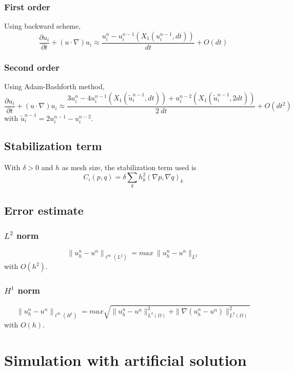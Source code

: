 \documentclass[a4paper]{article}
\begin{document}
\subsubsection{First order}
Using backward scheme, 
\[ \dfrac{\partial u_{i}}{\partial t} + (u \cdot \nabla)u_{i} \approx \dfrac{u_{i}^{n}-u_{i}^{n-1}(X_{1}(u_{i}^{n-1},dt))}{dt} + O(dt) \]
\subsubsection{Second order}
Using Adam-Bashforth method,
\[\dfrac{\partial u_{i}}{\partial t} + (u \cdot \nabla)u_{i} \approx \dfrac{3u_{i}^{n}-4u_{i}^{n-1}(X_{1}(\tilde{u}_{i}^{n-1},dt))+u_{i}^{n-2}(X_{1}(\tilde{u}_{i}^{n-1},2dt))}{2\ dt} + O(dt^2)\]
with $ \tilde{u}_{i}^{n-1} = 2u_{i}^{n-1}-u_{i}^{n-2} $.
\subsection{Stabilization term}
With $ \delta>0 $ and $ h $ as mesh size, the stabilization term used is
\[ C_{i}(p,q) = \delta \sum_{k} h_{k}^{2}(\nabla p, \nabla q)_{k} \]

\subsection{Error estimate}
\subsubsection{$ L^{2} $ norm}
\[\| u_{h}^{n}-u^{n} \|_{\ell^\infty(L^2)} =  max \ \| u_{h}^{n}-u^{n} \|_{L^{2}}\]
with $ O(h^2) $.
\subsubsection{$ H^{1} $ norm}
\[\| u_{h}^{n}-u^{n} \|_{\ell^\infty(H^{1})} = max \sqrt{\| u_{h}^{n}-u^{n} \|_{L^2(\Omega)}^{2} + \| \nabla (u_{h}^{n}-u^{n}) \|_{L^2(\Omega)}^{2}}\]
with $ O(h) $.

\newpage
\section{Simulation with artificial solution}
\end{document}
